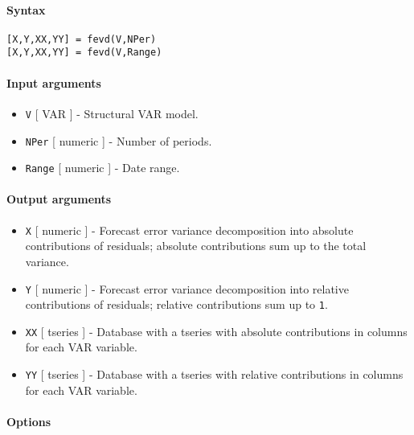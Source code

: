 


	\paragraph{Syntax}\label{syntax}

\begin{verbatim}
[X,Y,XX,YY] = fevd(V,NPer)
[X,Y,XX,YY] = fevd(V,Range)
\end{verbatim}

\paragraph{Input arguments}\label{input-arguments}

\begin{itemize}
\item
  \texttt{V} {[} VAR {]} - Structural VAR model.
\item
  \texttt{NPer} {[} numeric {]} - Number of periods.
\item
  \texttt{Range} {[} numeric {]} - Date range.
\end{itemize}

\paragraph{Output arguments}\label{output-arguments}

\begin{itemize}
\item
  \texttt{X} {[} numeric {]} - Forecast error variance decomposition
  into absolute contributions of residuals; absolute contributions sum
  up to the total variance.
\item
  \texttt{Y} {[} numeric {]} - Forecast error variance decomposition
  into relative contributions of residuals; relative contributions sum
  up to \texttt{1}.
\item
  \texttt{XX} {[} tseries {]} - Database with a tseries with absolute
  contributions in columns for each VAR variable.
\item
  \texttt{YY} {[} tseries {]} - Database with a tseries with relative
  contributions in columns for each VAR variable.
\end{itemize}

\paragraph{Options}\label{options}

